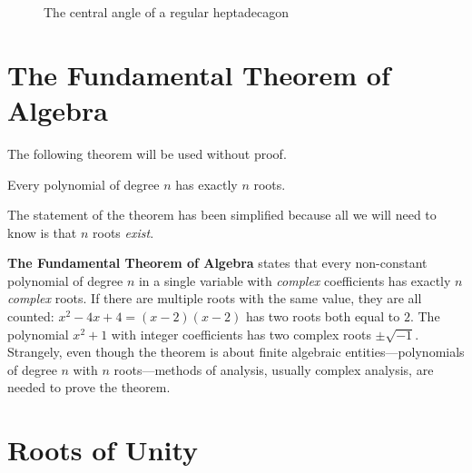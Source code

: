 \begin{figure}[t]
\begin{center}
\end{center}
\caption{The central angle of a regular heptadecagon}\label{f.hept-central4}
\end{figure}

\section{The Fundamental Theorem of Algebra}\label{s.fundamental}

The following theorem will be used without proof.

\begin{theorem}\label{thm.fundamental} Every polynomial of degree $n$ has exactly $n$ roots.
\end{theorem}

The statement of the theorem has been simplified because all we will need to know is that $n$ roots \emph{exist}.

\smallskip

\begin{advanced}
\textbf{The Fundamental Theorem of Algebra} states that every non-constant polynomial of degree $n$ in a single variable with \emph{complex} coefficients has exactly $n$ \emph{complex} roots. 
If there are multiple roots with the same value, they are all counted: $x^2-4x+4=(x-2)(x-2)$ has two roots both equal to $2$.
The polynomial $x^2+1$ with integer coefficients has two complex roots $\pm\sqrt{-1}$.
Strangely, even though the theorem is about finite algebraic entities---polynomials of degree $n$ with $n$ roots---methods of analysis, usually complex analysis, are needed to prove the theorem.
\end{advanced}

\section{Roots of Unity}\label{s.roots}

